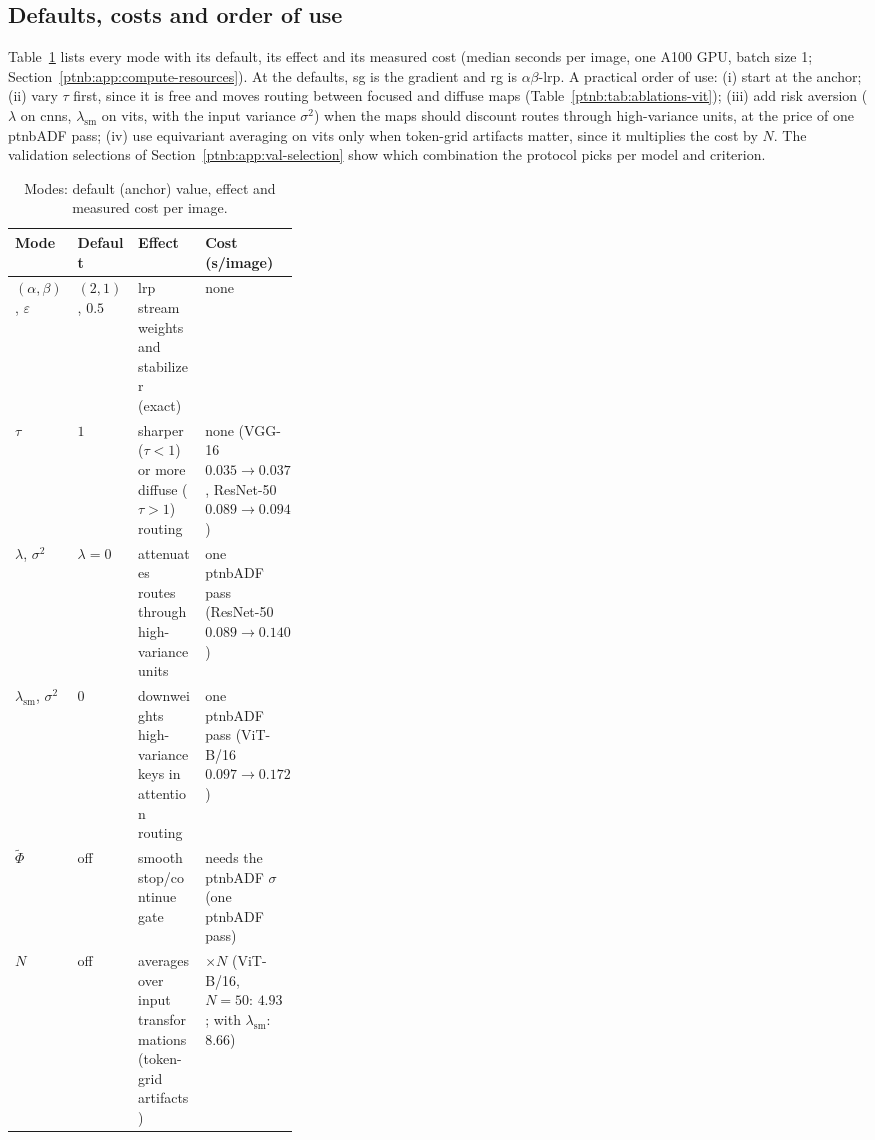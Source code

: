 \subsection{Defaults, costs and order of use}\label{ptnb:app:mode-guide}

Table~\ref{ptnb:tab:mode-guide} lists every mode with its default, its effect and its measured cost
(median seconds per image, one A100 GPU, batch size 1; Section~\ref{ptnb:app:compute-resources}). At
the defaults, \ac{sg} is the gradient and \ac{rg} is $\alpha\beta$-\ac{lrp}. A practical order of
use: (i) start at the anchor; (ii) vary $\tau$ first, since it is free and moves routing between
focused and diffuse maps (Table~\ref{ptnb:tab:ablations-vit}); (iii) add risk aversion ($\lambda$ on
\acp{cnn}, $\lambda_{\mathrm{sm}}$ on \acp{vit}, with the input variance $\sigma^2$) when the maps
should discount routes through high-variance units, at the price of one \ac{ptnbADF} pass; (iv) use
equivariant averaging on \acp{vit} only when token-grid artifacts matter, since it multiplies the
cost by $N$. The validation selections of Section~\ref{ptnb:app:val-selection} show which combination
the protocol picks per model and criterion.

\begin{table}[H]
    \centering
    \caption{Modes: default (anchor) value, effect and measured cost per image.}
    \label{ptnb:tab:mode-guide}
    \small
    \setlength{\tabcolsep}{3pt}
    \begin{tabularx}{\linewidth}{@{}l l >{\raggedright\arraybackslash}X
        >{\raggedright\arraybackslash}p{0.33\linewidth}@{}}
        \toprule
        Mode & Default & Effect & Cost (s/image) \\
        \midrule
        $(\alpha,\beta)$, $\varepsilon$ & $(2,1)$, $0.5$ & \ac{lrp} stream weights and stabilizer (exact) &
        none \\
        $\tau$ & $1$ & sharper ($\tau<1$) or more diffuse ($\tau>1$) routing & none (VGG-16
        $0.035\to0.037$, ResNet-50 $0.089\to0.094$) \\
        $\lambda$, $\sigma^2$ & $\lambda{=}0$ & attenuates routes through high-variance units & one
        \ac{ptnbADF} pass (ResNet-50 $0.089\to0.140$) \\
        $\lambda_{\mathrm{sm}}$, $\sigma^2$ & $0$ & downweights high-variance keys in attention routing &
        one \ac{ptnbADF} pass (ViT-B/16 $0.097\to0.172$) \\
        $\tilde\Phi$ & off & smooth stop/continue gate & needs the \ac{ptnbADF} $\sigma$ (one \ac{ptnbADF} pass) \\
        $N$ & off & averages over input transformations (token-grid artifacts) & $\times N$ (ViT-B/16,
        $N{=}50$: $4.93$; with $\lambda_{\mathrm{sm}}$: $8.66$) \\
        \bottomrule
    \end{tabularx}
\end{table}

